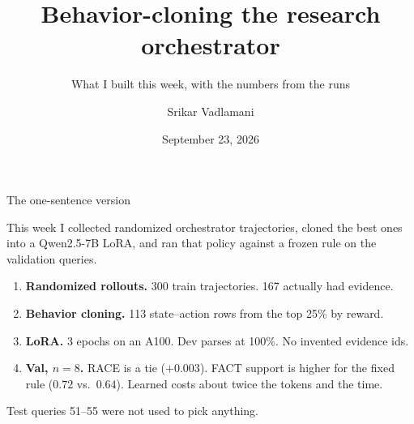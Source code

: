 \documentclass[aspectratio=169,11pt]{beamer}
\title{Behavior-cloning the research orchestrator}
\subtitle{What I built this week, with the numbers from the runs}
\author{Srikar Vadlamani}
\date{September 23, 2026}
\institute{PILOT stage 1 \textbullet\ Deep Research Bench}
\begin{document}
\begin{frame}
  \titlepage
\end{frame}

\begin{frame}{The one-sentence version}
  \begin{block}{This week}
    I collected randomized orchestrator trajectories, cloned the best ones
    into a Qwen2.5-7B LoRA, and ran that policy against a frozen rule on the
    validation queries.
  \end{block}
  \vspace{0.4em}
  \begin{enumerate}
    \item \textbf{Randomized rollouts.} 300 train trajectories. 167 actually had evidence.
    \item \textbf{Behavior cloning.} 113 state--action rows from the top 25\% by reward.
    \item \textbf{LoRA.} 3 epochs on an A100. Dev parses at 100\%. No invented evidence ids.
    \item \textbf{Val, $n=8$.} RACE is a tie ($+0.003$). FACT support is higher for the fixed rule ($0.72$ vs.\ $0.64$). Learned costs about twice the tokens and the time.
  \end{enumerate}
  \vspace{0.5em}
  Test queries 51--55 were not used to pick anything.
\end{frame}
\end{document}
